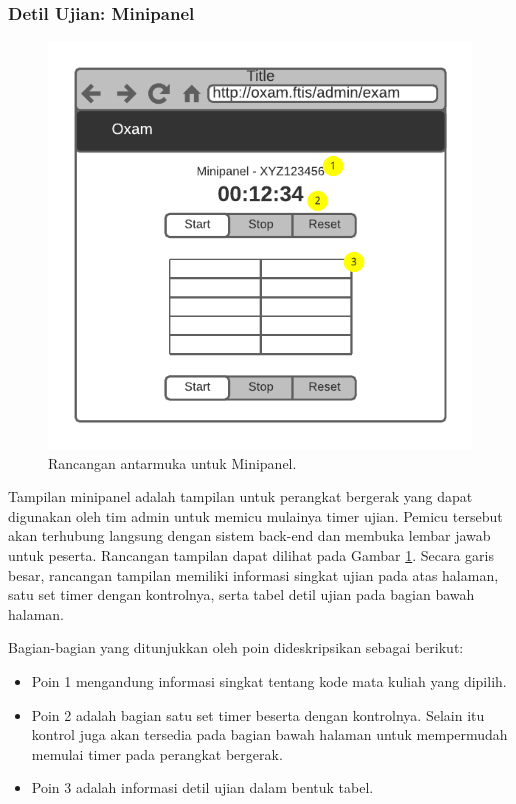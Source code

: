 \subsubsection{Detil Ujian: Minipanel}
    \begin{figure}
        \centering
        \includegraphics{Gambar/mockups/Mockup--Admin - Minipanel.pdf}
        \caption{Rancangan antarmuka untuk Minipanel.}
        \label{fig:mockup_admin_minipanel}
    \end{figure}
    Tampilan minipanel adalah tampilan untuk perangkat bergerak yang dapat
    digunakan oleh tim admin untuk memicu mulainya timer ujian. Pemicu tersebut
    akan terhubung langsung dengan sistem back-end dan membuka lembar jawab
    untuk peserta. Rancangan tampilan dapat dilihat pada Gambar
    \ref{fig:mockup_admin_minipanel}. Secara garis besar, rancangan tampilan
    memiliki informasi singkat ujian pada atas halaman, satu set timer dengan
    kontrolnya, serta tabel detil ujian pada bagian bawah halaman.
    
    Bagian-bagian yang ditunjukkan oleh poin dideskripsikan sebagai berikut:
    \begin{itemize}
        \item Poin 1 mengandung informasi singkat tentang kode mata kuliah yang
        dipilih.
        
        \item Poin 2 adalah bagian satu set timer beserta dengan kontrolnya.
            Selain itu kontrol juga akan tersedia pada bagian bawah halaman
            untuk mempermudah memulai timer pada perangkat bergerak.
            
        \item Poin 3 adalah informasi detil ujian dalam bentuk tabel.
    \end{itemize}
    

